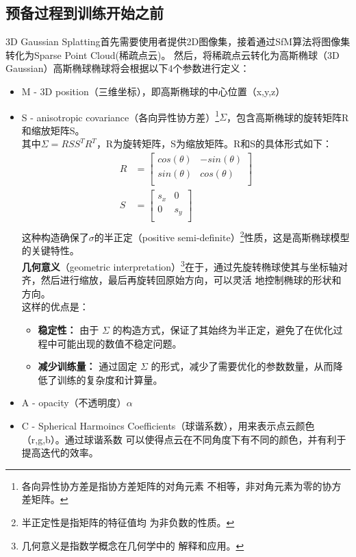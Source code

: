 \documentclass{nwputhesis}
\begin{document}
\subsection{预备过程到训练开始之前}
\indent
3D Gaussian Splatting首先需要使用者提供2D图像集，接着通过SfM算法将图像集转化为Sparse Point Cloud(稀疏点云)。
然后，将稀疏点云转化为高斯椭球（3D Gaussian）高斯椭球椭球将会根据以下4个参数进行定义：
\begin{itemize}
    \item M - 3D position（三维坐标），即高斯椭球的中心位置（x,y,z）
    \item S - anisotropic covariance（各向异性协方差）\footnote{各向异性协方差是指协方差矩阵的对角元素
    不相等，非对角元素为零的协方差矩阵。}$\Sigma$，包含高斯椭球的旋转矩阵R和缩放矩阵S。\\
    其中$\Sigma = RSS^TR^T$，R为旋转矩阵，S为缩放矩阵。R和S的具体形式如下：
    \begin{equation}
        \begin{aligned}
            R &= \begin{bmatrix}
                cos(\theta) & -sin(\theta)\\
                sin(\theta) & cos(\theta)\\
            \end{bmatrix}\\
            S &= \begin{bmatrix}
                s_x & 0\\
                0 & s_y\\
            \end{bmatrix}\\
        \end{aligned}
    \end{equation}
    这种构造确保了$\sigma$的半正定（positive semi-definite）\footnote{半正定性是指矩阵的特征值均
    为非负数的性质。}性质，这是高斯椭球模型的关键特性。\\
    \textbf{几何意义}（geometric interpretation）\footnote{几何意义是指数学概念在几何学中的
    解释和应用。}在于，通过先旋转椭球使其与坐标轴对齐，然后进行缩放，最后再旋转回原始方向，可以灵活
    地控制椭球的形状和方向。\\
    这样的优点是：
    \begin{itemize}
        \item \textbf{稳定性：} 由于 $\Sigma$ 的构造方式，保证了其始终为半正定，避免了在优化过程中可能出现的数值不稳定问题。
        \item \textbf{减少训练量：} 通过固定 $\Sigma$ 的形式，减少了需要优化的参数数量，从而降低了训练的复杂度和计算量。
    \end{itemize}
    \item A - opacity（不透明度）$\alpha$
    \item C - Spherical Harmoincs Coefficients（球谐系数），用来表示点云颜色（r,g,b）。通过球谐系数
    可以使得点云在不同角度下有不同的颜色，并有利于提高迭代的效率。
\end{itemize}
\end{document}
